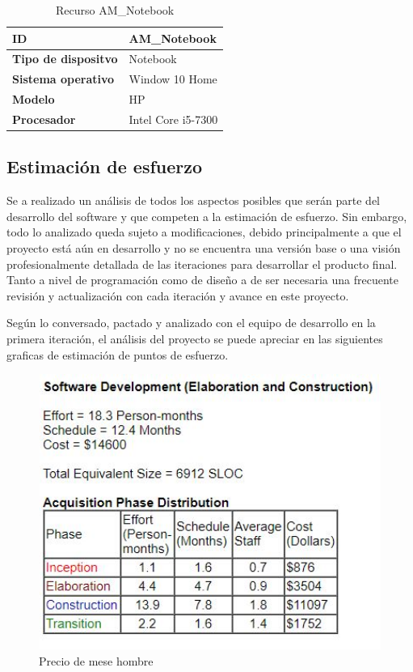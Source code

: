 \begin{table}[H]
    \centering
        \begin{tabular}{|l | p{12cm} |}        
        \hline
        \textbf{ID} & AM\_Notebook \\
        \hline
        \textbf{Tipo de dispositvo} & Notebook \\
        \hline
        \textbf{Sistema operativo} & Window 10 Home \\
        \hline
        \textbf{Modelo} & HP \\
        \hline
        \textbf{Procesador} & Intel Core i5-7300 \\    
        \hline            
        \end{tabular}
    \caption{Recurso AM\_Notebook}
\end{table}

\subsection{Estimación de esfuerzo}
Se a realizado un análisis de todos los aspectos posibles que serán parte del desarrollo del software y que competen a la estimación de esfuerzo. Sin embargo, todo lo analizado queda sujeto a modificaciones, debido principalmente a que el proyecto está aún en desarrollo y no se encuentra una versión base o una visión profesionalmente detallada de las iteraciones para desarrollar el producto final. Tanto a nivel de programación como de diseño a de ser necesaria una frecuente revisión y actualización con cada iteración y avance en este proyecto.

Según lo conversado, pactado y analizado con el equipo de desarrollo en la primera iteración, el análisis del proyecto se puede apreciar en las siguientes graficas de estimación de puntos de esfuerzo.

\begin{figure}[H]
	\centering
	\includegraphics[width=16cm, height=9cm]{imgs/1.JPG}
	\caption{Precio de mese hombre}
\end{figure}


